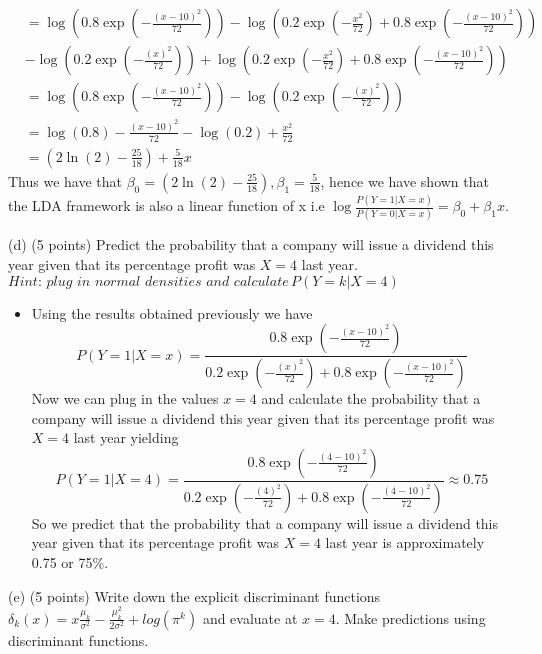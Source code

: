 \documentclass[
]{article}
\begin{document}
\begin{enumerate}
\begin{itemize}
\begin{align*}
&= \log\left( 0.8\exp(-\frac{(x-10)^2}{72})\right) - \log\left(0.2\exp(-\frac{x^2}{72}) + 0.8 \exp(-\frac{(x-10)^2}{72})\right) \\&- \log\left( 0.2\exp(-\frac{(x)^2}{72})\right) + \log\left(0.2\exp(-\frac{x^2}{72}) + 0.8 \exp(-\frac{(x-10)^2}{72})\right)\\ 
&= \log\left( 0.8\exp(-\frac{(x-10)^2}{72})\right) - \log\left( 0.2\exp(-\frac{(x)^2}{72})\right) \\
&= \log\left( 0.8 \right) - \frac{(x-10)^2}{72} - \log\left( 0.2 \right) + \frac{x^2}{72} \\
&=\left(2\ln(2) - \frac{25}{18}\right) + \frac{5}{18}x
\end{align*}
Thus we have that $\beta_0 = \left(2\ln(2) - \frac{25}{18}\right) , \beta_1 = \frac{5}{18}$, hence we have shown that the LDA framework is also a linear function of x i.e $\log\frac{P(Y = 1 | X = x)}{P(Y= 0| X = x)} = \beta_0 + \beta_1x$.

\end{itemize}

(d) (5 points) Predict the probability that a company will issue a dividend this year given that its percentage profit was $X = 4$ last year. $\textit{Hint: plug in normal densities and calculate} \, P(Y = k | X = 4)$

\begin{itemize}

\item Using the results obtained previously we have 
$$
P(Y = 1 | X = x) = \frac{0.8\exp\left(-\frac{(x-10)^2}{72}\right)}{0.2 \exp\left(-\frac{(x)^2}{72}\right) + 0.8 \exp\left(-\frac{(x-10)^2}{72}\right)} 
$$
Now we can plug in the values $x = 4$ and calculate the probability that a company will issue a dividend this year given that its percentage profit was $X = 4$ last year yielding 
$$
P(Y = 1 | X = 4) = \frac{0.8\exp\left(-\frac{(4-10)^2}{72}\right)}{0.2 \exp\left(-\frac{(4)^2}{72}\right) + 0.8 \exp\left(-\frac{(4-10)^2}{72}\right)} \approx 0.75
$$
So we predict that the probability that a company will issue a dividend this year given that its percentage profit was $X = 4$ last year is approximately 0.75 or 75\%.

\end{itemize}

(e) (5 points) Write down the explicit discriminant functions $\delta_k(x) = x\frac{\mu_k}{\sigma^2} - \frac{\mu_k^2}{2\sigma^2} + log(\pi^k)$ and evaluate at $x = 4$. Make predictions using discriminant functions.


\end{enumerate}
\end{document}
